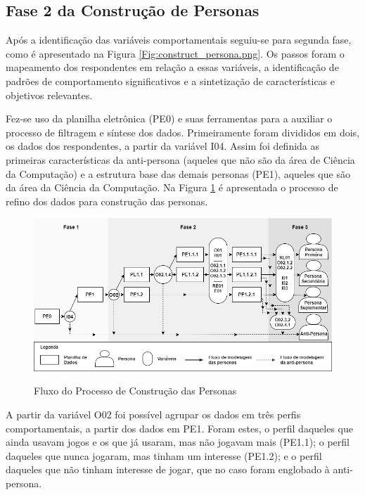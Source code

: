 \subsection{Fase 2 da Construção de Personas}
\label{sub:const-pers}
Após a identificação das variáveis comportamentais seguiu-se para segunda fase, como é apresentado na Figura \ref{Fig:construct_persona.png}. Os passos foram o mapeamento dos respondentes em relação a essas variáveis, a identificação de padrões de comportamento significativos e a sintetização de características e objetivos relevantes.

Fez-se uso da planilha eletrônica (PE0) e suas ferramentas para a auxiliar o processo de filtragem e síntese dos dados. Primeiramente foram divididos em dois, os dados dos respondentes, a partir da variável I04. Assim foi definida as primeiras características da anti-persona (aqueles que não são da área de Ciência da Computação) e a estrutura base das demais personas (PE1), aqueles que são da área da Ciência da Computação. Na Figura \ref{Fig:persona_tree.png} é apresentada o processo de refino dos dados para construção das personas.

\begin{figure}[htbp]
	\centering
	\caption{Fluxo do Processo de Construção das Personas}
	\includegraphics[keepaspectratio=true,scale=0.55]{figuras/metodologia/persona_tree.png}
	\label{Fig:persona_tree.png}
\end{figure}


A partir da variável O02 foi possível agrupar os dados em três perfis comportamentais, a partir dos dados em PE1. Foram estes, o perfil daqueles que ainda usavam jogos e os que já usaram, mas não jogavam mais (PE1.1); o perfil  daqueles que nunca jogaram, mas tinham um interesse (PE1.2); e o perfil daqueles que não tinham interesse de jogar, que no caso foram englobado à anti-persona.

